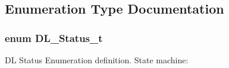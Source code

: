 \subsection{Enumeration Type Documentation}
\subsubsection[{\texorpdfstring{D\+L\+\_\+\+Status\+\_\+t}{DL_Status_t}}]{\setlength{\rightskip}{0pt plus 5cm}enum {\bf D\+L\+\_\+\+Status\+\_\+t}}\hypertarget{group___k_n_x___d_l___exported___types_ga143539be3680d9b7f990a9dfe1df40fe}{}\label{group___k_n_x___d_l___exported___types_ga143539be3680d9b7f990a9dfe1df40fe}


DL Status Enumeration definition. State machine\+: 

